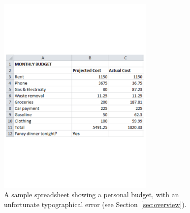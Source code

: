 \begin{figure}[!t]
\centering
\includegraphics[width=3in]{overview-example}
  \caption{A sample spreadsheet showing a personal budget, with an unfortunate typographical error (see Section~\ref{sec:overview}).\label{fig:personal_budget}}
\end{figure}

